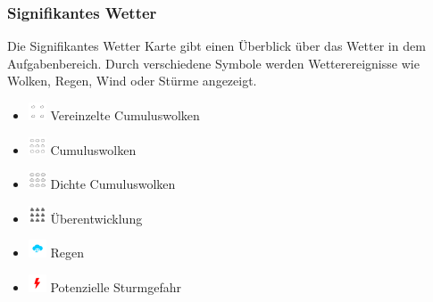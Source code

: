 \documentclass[11pt,a4paper]{article}
\begin{document}
\subsubsection{Signifikantes Wetter}
Die Signifikantes Wetter Karte gibt einen Überblick über das Wetter in dem Aufgabenbereich. Durch verschiedene Symbole werden Wetterereignisse wie Wolken, Regen, Wind oder Stürme angezeigt. 
\begin{itemize}
  \item \includegraphics[height=15pt]{images/icons/cu-1.png} Vereinzelte Cumuluswolken
  \item \includegraphics[height=15pt]{images/icons/cu-2.png} Cumuluswolken
  \item \includegraphics[height=15pt]{images/icons/cu-od-3.png} Dichte Cumuluswolken
  \item \includegraphics[height=15pt]{images/icons/cu-od-4.png} Überentwicklung
  \item \includegraphics[height=15pt]{images/icons/cu-rain-7.png} Regen
  \item \includegraphics[height=15pt]{images/icons/cu-storm-6.png} Potenzielle Sturmgefahr
\end{itemize}
\end{document}
